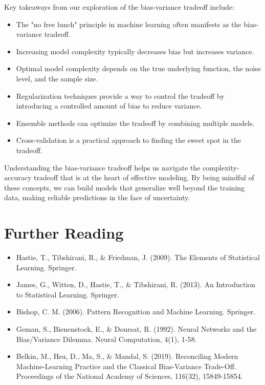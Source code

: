 \documentclass{article}
\begin{document}
Key takeaways from our exploration of the bias-variance tradeoff include:

\begin{itemize}
\item The "no free lunch" principle in machine learning often manifests as the bias-variance tradeoff.
\item Increasing model complexity typically decreases bias but increases variance.
\item Optimal model complexity depends on the true underlying function, the noise level, and the sample size.
\item Regularization techniques provide a way to control the tradeoff by introducing a controlled amount of bias to reduce variance.
\item Ensemble methods can optimize the tradeoff by combining multiple models.
\item Cross-validation is a practical approach to finding the sweet spot in the tradeoff.
\end{itemize}

Understanding the bias-variance tradeoff helps us navigate the complexity-accuracy tradeoff that is at the heart of effective modeling. By being mindful of these concepts, we can build models that generalize well beyond the training data, making reliable predictions in the face of uncertainty.

\section*{Further Reading}

\begin{itemize}
\item Hastie, T., Tibshirani, R., \& Friedman, J. (2009). The Elements of Statistical Learning. Springer.
\item James, G., Witten, D., Hastie, T., \& Tibshirani, R. (2013). An Introduction to Statistical Learning. Springer.
\item Bishop, C. M. (2006). Pattern Recognition and Machine Learning. Springer.
\item Geman, S., Bienenstock, E., \& Doursat, R. (1992). Neural Networks and the Bias/Variance Dilemma. Neural Computation, 4(1), 1-58.
\item Belkin, M., Hsu, D., Ma, S., \& Mandal, S. (2019). Reconciling Modern Machine-Learning Practice and the Classical Bias-Variance Trade-Off. Proceedings of the National Academy of Sciences, 116(32), 15849-15854.
\end{itemize}
\end{document}
